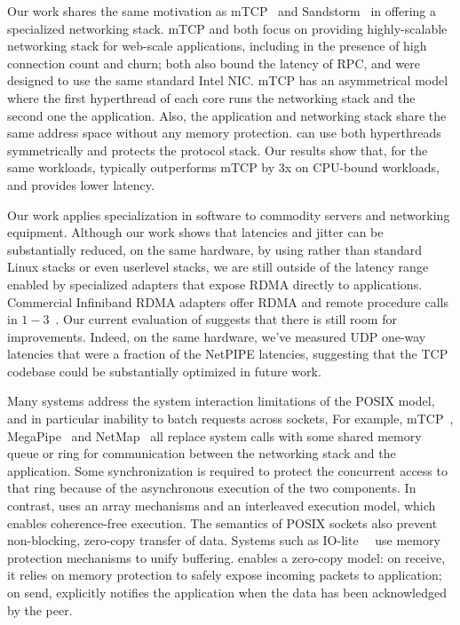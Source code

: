  Our work shares the same
motivation as mTCP~\cite{jeong2014mtcp} and
Sandstorm~\cite{marinos2013network} in offering a specialized
networking stack.  mTCP and \ix both focus on
providing highly-scalable
networking stack for web-scale applications, including in the presence
of high connection count and churn; both also bound the
latency of RPC, and were designed to use the same standard Intel NIC.
mTCP has an asymmetrical model where the first hyperthread of each
core runs the networking stack and the second one the application.
Also, the application and networking stack share the same address
space without any memory protection.  \ix can use both hyperthreads symmetrically
and protects the protocol stack.   Our results show
that, for the same workloads, \ix typically outperforms mTCP by 3x on
CPU-bound workloads, and provides lower latency.
 

 Our work applies
specialization in software to commodity servers and networking
equipment.  Although our work shows that latencies and jitter can be
substantially reduced, on the same hardware, by using \ix rather than
standard Linux stacks or even userlevel stacks, we are still outside
of the latency range enabled by specialized adapters that expose RDMA
directly to applications.  Commercial Infiniband RDMA adapters offer
RDMA and remote procedure calls in
$1-3$\microsecond~\cite{DBLP:conf/sosp/OngaroRSOR11,Jose:2011:MDH,mitchell:rdma,dragojevic14farm}.
Our current evaluation of \ix suggests that there is still room for
improvements.  Indeed, on the same hardware, we've measured UDP
one-way latencies that were a fraction of the NetPIPE latencies,
suggesting that the TCP codebase could be substantially optimized in
future work. 

 Many systems
address the system interaction limitations of the POSIX model, and in
particular inability to batch requests across sockets, For example,
mTCP~\cite{jeong2014mtcp}, MegaPipe~\cite{han2012megapipe} and
NetMap~\cite{rizzo2012netmap} all replace system calls with some
shared memory queue or ring for communication between the networking
stack and the application.  Some synchronization is required to
protect the concurrent access to that ring because of the asynchronous
execution of the two components.  In contrast, \ix uses an array
mechanisms and an interleaved execution model, which enables
coherence-free execution.  The semantics of POSIX sockets also prevent
non-blocking, zero-copy transfer of data. Systems such as
IO-lite~~\cite{DBLP:journals/tocs/PaiDZ00} use memory protection
mechanisms to unify buffering.  \ix enables a zero-copy model: on
receive, it relies on memory protection to safely expose incoming
packets to application; on send, \ix explicitly notifies the
application when the data has been acknowledged by the peer.



